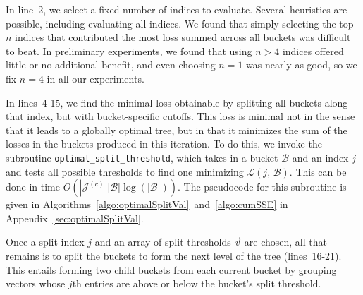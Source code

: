 In line~2, we select a fixed number of indices to evaluate. Several heuristics are possible, including evaluating all indices. We found that simply selecting the top $n$ indices that contributed the most loss summed across all buckets was difficult to beat. In preliminary experiments, we found that using $n > 4$ indices offered little or no additional benefit, and even choosing $n = 1$ was nearly as good, so we fix $n = 4$ in all our experiments.

In lines~4-15, we find the minimal loss obtainable by splitting all buckets along that index, but with bucket-specific cutoffs. This loss is minimal not in the sense that it leads to a globally optimal tree, but in that it minimizes the sum of the losses in the buckets produced in this iteration. To do this, we invoke the subroutine \texttt{optimal\_split\_threshold}, which takes in a bucket $\mathcal{B}$ and an index $j$ and tests all possible thresholds to find one minimizing $\mathcal{L}(j \text{, } \mathcal{B})$. This can be done in time $O(|\mathcal{J}^{(c)}||\mathcal{B}| \log(|\mathcal{B}|))$. The pseudocode for this subroutine is given in Algorithms~\ref{algo:optimalSplitVal}~and~\ref{algo:cumSSE} in Appendix~\ref{sec:optimalSplitVal}.

Once a split index $j$ and an array of split thresholds $\vec{v}$ are chosen, all that remains is to split the buckets to form the next level of the tree (lines~16-21). This entails forming two child buckets from each current bucket by grouping vectors whose $j$th entries are above or below the bucket's split threshold.%


